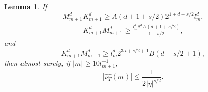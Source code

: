 \documentclass[12pt,reqno]{article}
\newtheorem{lemma}[theorem]{Lemma}
\begin{document}
\begin{lemma} \label{largeFrequencyLemma}
    If
    \begin{equation} \label{equation129041902412901290129}
        M_{m+1}^d K_{m+1}^d \geq A(d + 1 + s/2) 2^{1 + d + s/2} l_m^d,
    \end{equation}
    \begin{equation} \label{equation190512919204912901}
    \begin{split}
        K_{m+1}^d M_{m+1}^d \geq \frac{l_m^d 8^d A(d + 1 + s/2)}{1 + s/2},
    \end{split}
    \end{equation}
    and
    \begin{equation} \label{equation68943893493849}
        K_{m+1}^d M_{m+1}^d \geq l_m^d 2^{3d + s/2 + 1} B(d + s/2 + 1),
    \end{equation}
    then almost surely, if $|m| \geq 10l_{m+1}^{-1}$,
    \[ |\widehat{\nu_T}(m)| \leq \frac{1}{2|\eta|^{s/2}}. \]
\end{lemma}
\end{document}
